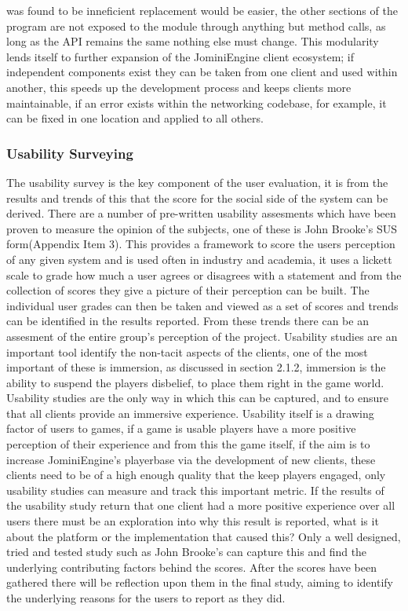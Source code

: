 \documentclass{article}
\begin{document}
was found to be inneficient replacement would be easier, the other sections of the program are not exposed to the module through anything but method calls, as long as the API remains the same nothing else must change. This modularity lends itself to further expansion of the JominiEngine client ecosystem; if independent components exist they can be taken from one client and used within another, this speeds up the development process and keeps clients more maintainable, if an error exists within the networking codebase, for example, it can be fixed in one location and applied to all others.
	\subsubsection{Usability Surveying}
	The usability survey is the key component of the user evaluation, it is from the results and trends of this that the score for the social side of the system can be derived. There are a number of pre-written usability assesments which have been proven to measure the opinion of the subjects, one of these is John Brooke's SUS form\cite{Brooke96sus:a}(Appendix Item 3). This provides a framework to score the users perception of any given system and is used often in industry and academia, it uses a lickett scale to grade how much a user agrees or disagrees with a statement and from the collection of scores they give a picture of their perception can be built. The individual user grades can then be taken and viewed as a set of scores and trends can be identified in the results reported. From these trends there can be an assesment of the entire group's perception of the project. Usability studies are an important tool identify the non-tacit aspects of the clients, one of the most important of these is immersion, as discussed in section 2.1.2, immersion is the ability to suspend the players disbelief, to place them right in the game world. Usability studies are the only way in which this can be captured, and to ensure that all clients provide an immersive experience. Usability itself is a drawing factor of users to games, if a game is usable players have a more positive perception of their experience and from this the game itself\cite{Christou:2012:EPP:2367616.2367630}, if the aim is to increase JominiEngine's playerbase via the development of new clients, these clients need to be of a high enough quality that the keep players engaged, only usability studies can measure and track this important metric. If the results of the usability study return that one client had a more positive experience over all users there must be an exploration into why this result is reported, what is it about the platform or the implementation that caused this? Only a well designed, tried and tested study such as John Brooke's can capture this and find the underlying contributing factors behind the scores. After the scores have been gathered there will be reflection upon them in the final study, aiming to identify the underlying reasons for the users to report as they did.
\end{document}
